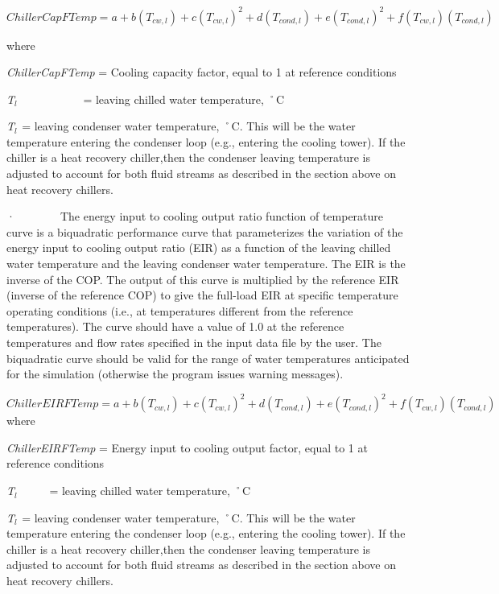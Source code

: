 \begin{equation}
ChillerCapFTemp = a + b({T_{cw,l}}) + c{({T_{cw,l}})^2} + d({T_{cond,l}}) + e{({T_{cond,l}})^2} + f({T_{cw,l}})({T_{cond,l}})
\end{equation}

where

\emph{ChillerCapFTemp} = Cooling capacity factor, equal to 1 at reference conditions

\emph{T\(_{l}\)}~~~~~~~~~~~ = leaving chilled water temperature, ˚C

\emph{T\(_{l}\)}\(_{ }\) = leaving condenser water temperature, ˚C. This will be the water temperature entering the condenser loop (e.g., entering the cooling tower). If the chiller is a heat recovery chiller,then the condenser leaving temperature is adjusted to account for both fluid streams as described in the section above on heat recovery chillers.

·~~~~~~~~The energy input to cooling output ratio function of temperature curve is a biquadratic performance curve that parameterizes the variation of the energy input to cooling output ratio (EIR) as a function of the leaving chilled water temperature and the leaving condenser water temperature. The EIR is the inverse of the COP. The output of this curve is multiplied by the reference EIR (inverse of the reference COP) to give the full-load EIR at specific temperature operating conditions (i.e., at temperatures different from the reference temperatures). The curve should have a value of 1.0 at the reference temperatures and flow rates specified in the input data file by the user. The biquadratic curve should be valid for the range of water temperatures anticipated for the simulation (otherwise the program issues warning messages).

\(ChillerEIRFTemp = a + b({T_{cw,l}}) + c{({T_{cw,l}})^2} + d({T_{cond,l}}) + e{({T_{cond,l}})^2} + f({T_{cw,l}})({T_{cond,l}})\) where

\emph{ChillerEIRFTemp} = Energy input to cooling output factor, equal to 1 at reference conditions

\emph{T\(_{l}\)}~~~~~ = leaving chilled water temperature, ˚C

\emph{T\(_{l}\)}\(_{ }\) = leaving condenser water temperature, ˚C. This will be the water temperature entering the condenser loop (e.g., entering the cooling tower). If the chiller is a heat recovery chiller,then the condenser leaving temperature is adjusted to account for both fluid streams as described in the section above on heat recovery chillers.


